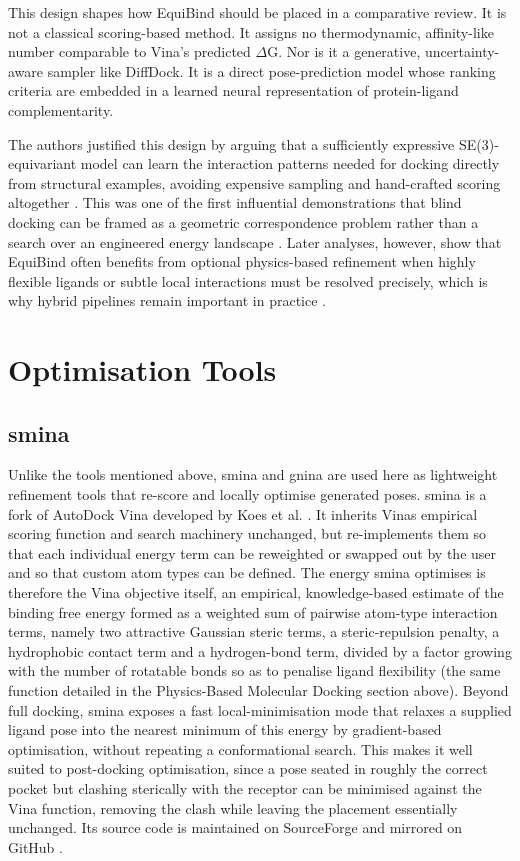 This design shapes how EquiBind should be placed in a comparative review. It is not a classical scoring-based method. It assigns no thermodynamic, affinity-like number comparable to Vina's predicted \ensuremath{\Delta}G. Nor is it a generative, uncertainty-aware sampler like DiffDock. It is a direct pose-prediction model whose ranking criteria are embedded in a learned neural representation of protein-ligand complementarity.

The authors justified this design by arguing that a sufficiently expressive SE(3)-equivariant model can learn the interaction patterns needed for docking directly from structural examples, avoiding expensive sampling and hand-crafted scoring altogether \cite{ref010}. This was one of the first influential demonstrations that blind docking can be framed as a geometric correspondence problem rather than a search over an engineered energy landscape \cite{ref010}. Later analyses, however, show that EquiBind often benefits from optional physics-based refinement when highly flexible ligands or subtle local interactions must be resolved precisely, which is why hybrid pipelines remain important in practice \cite{ref035}.

\hypertarget{optimization-tools-1}{%
\section{Optimisation Tools}\label{optimization-tools-1}}

\hypertarget{smina-1}{%
\subsection{smina}\label{smina-1}}

Unlike the tools mentioned above, smina and gnina are used here as lightweight refinement tools that re-score and locally optimise generated poses. smina is a fork of AutoDock Vina developed by Koes et al. \cite{ref055}. It inherits Vina\textquotesingle s empirical scoring function and search machinery unchanged, but re-implements them so that each individual energy term can be reweighted or swapped out by the user and so that custom atom types can be defined. The energy smina optimises is therefore the Vina objective itself, an empirical, knowledge-based estimate of the binding free energy formed as a weighted sum of pairwise atom-type interaction terms, namely two attractive Gaussian steric terms, a steric-repulsion penalty, a hydrophobic contact term and a hydrogen-bond term, divided by a factor growing with the number of rotatable bonds so as to penalise ligand flexibility (the same function detailed in the Physics-Based Molecular Docking section above). Beyond full docking, smina exposes a fast local-minimisation mode that relaxes a supplied ligand pose into the nearest minimum of this energy by gradient-based optimisation, without repeating a conformational search. This makes it well suited to post-docking optimisation, since a pose seated in roughly the correct pocket but clashing sterically with the receptor can be minimised against the Vina function, removing the clash while leaving the placement essentially unchanged. Its source code is maintained on SourceForge and mirrored on GitHub \cite{ref057}.

